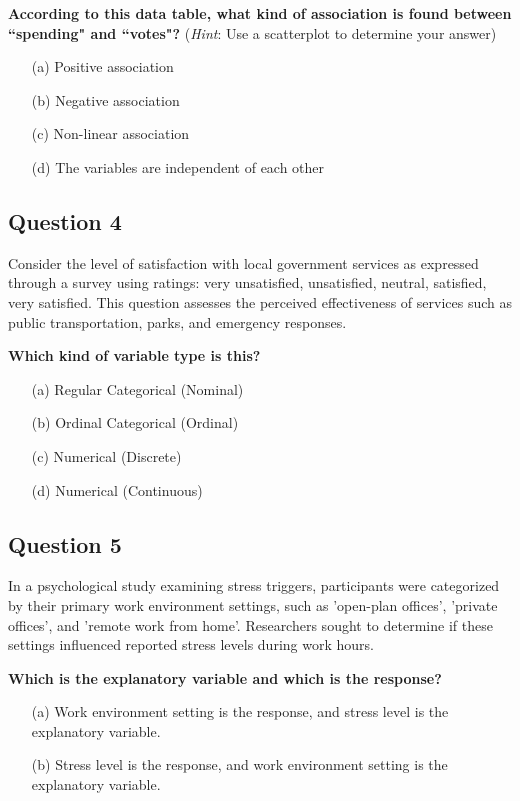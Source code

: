 \documentclass[11pt]{article}
\begin{document}
\textbf{According to this data table, what kind of association is found between ``spending" and ``votes"?} (\emph{Hint}: Use a scatterplot to determine your answer)
\begin{enumerate}
    \item[(a)] Positive association
    \item[(b)] Negative association
    \item[(c)] Non-linear association
    \item[(d)] The variables are independent of each other
\end{enumerate}

\subsection*{Question 4}
Consider the level of satisfaction with local government services as expressed through a survey using ratings: very unsatisfied, unsatisfied, neutral, satisfied, very satisfied. This question assesses the perceived effectiveness of services such as public transportation, parks, and emergency responses.

\textbf{Which kind of variable type is this?}
\begin{enumerate}
    \item[(a)] Regular Categorical (Nominal)
    \item[(b)] Ordinal Categorical (Ordinal)
    \item[(c)] Numerical (Discrete)
    \item[(d)] Numerical (Continuous)
\end{enumerate}

\subsection*{Question 5}
In a psychological study examining stress triggers, participants were categorized by their primary work environment settings, such as 'open-plan offices', 'private offices', and 'remote work from home'. Researchers sought to determine if these settings influenced reported stress levels during work hours.

\textbf{Which is the explanatory variable and which is the response?}
\begin{enumerate}
    \item[(a)] Work environment setting is the response, and stress level is the explanatory variable.
    \item[(b)] Stress level is the response, and work environment setting is the explanatory variable.
\end{enumerate}
\end{document}
